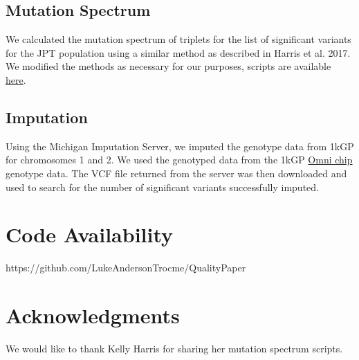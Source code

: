 \documentclass[9pt,lineno]{elife}
\begin{document}
\subsection{Mutation Spectrum}
We calculated the mutation spectrum of triplets for the list of significant variants for the JPT population using a similar method as described in Harris et al. 2017. \citep{Harris2017a}
We modified the methods as necessary for our purposes, scripts are available \href{https://github.com/LukeAndersonTrocme/QualityPaper}{here}. 

\subsection{Imputation}
Using the Michigan Imputation Server, we imputed the genotype data from 1kGP for chromosomes 1 and 2.
We used the genotyped data from the 1kGP \href{ftp://ftp.1000genomes.ebi.ac.uk/vol1/ftp/release/20130502/supporting/hd_genotype_chip/ALL.chip.omni_broad_sanger_combined.20140818.snps.genotypes.vcf.gz}{Omni chip} genotype data.
The VCF file returned from the server was then downloaded and used to search for the number of significant variants successfully imputed. 



\section{Code Availability}
https://github.com/LukeAndersonTrocme/QualityPaper

\section{Acknowledgments}
We would like to thank Kelly Harris for sharing her mutation spectrum scripts.
\end{document}

